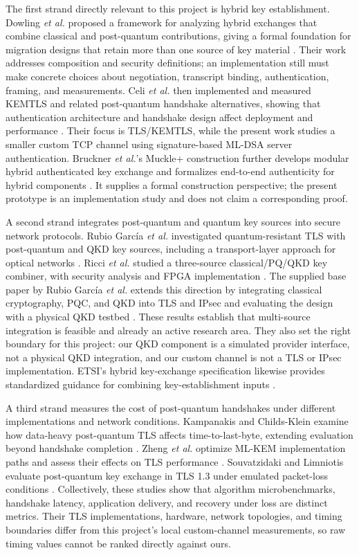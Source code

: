 \documentclass[journal]{IEEEtran}
\begin{document}
The first strand directly relevant to this project is hybrid key establishment. Dowling \emph{et al.} proposed a framework for analyzing hybrid exchanges that combine classical and post-quantum contributions, giving a formal foundation for migration designs that retain more than one source of key material \cite{dowling2020}. Their work addresses composition and security definitions; an implementation still must make concrete choices about negotiation, transcript binding, authentication, framing, and measurements. Celi \emph{et al.} then implemented and measured KEMTLS and related post-quantum handshake alternatives, showing that authentication architecture and handshake design affect deployment and performance \cite{celi2021}. Their focus is TLS/KEMTLS, while the present work studies a smaller custom TCP channel using signature-based ML-DSA server authentication. Bruckner \emph{et al.}'s Muckle+ construction further develops modular hybrid authenticated key exchange and formalizes end-to-end authenticity for hybrid components \cite{bruckner2023}. It supplies a formal construction perspective; the present prototype is an implementation study and does not claim a corresponding proof.

A second strand integrates post-quantum and quantum key sources into secure network protocols. Rubio Garc\'ia \emph{et al.} investigated quantum-resistant TLS with post-quantum and QKD key sources, including a transport-layer approach for optical networks \cite{rubio2024tls,rubio2024ofc}. Ricci \emph{et al.} studied a three-source classical/PQ/QKD key combiner, with security analysis and FPGA implementation \cite{ricci2024}. The supplied base paper by Rubio Garc\'ia \emph{et al.} extends this direction by integrating classical cryptography, PQC, and QKD into TLS and IPsec and evaluating the design with a physical QKD testbed \cite{rubio2025}. These results establish that multi-source integration is feasible and already an active research area. They also set the right boundary for this project: our QKD component is a simulated provider interface, not a physical QKD integration, and our custom channel is not a TLS or IPsec implementation. ETSI's hybrid key-exchange specification likewise provides standardized guidance for combining key-establishment inputs \cite{etsi103744}.

A third strand measures the cost of post-quantum handshakes under different implementations and network conditions. Kampanakis and Childs-Klein examine how data-heavy post-quantum TLS affects time-to-last-byte, extending evaluation beyond handshake completion \cite{kampanakis2024}. Zheng \emph{et al.} optimize ML-KEM implementation paths and assess their effects on TLS performance \cite{zheng2024}. Souvatzidaki and Limniotis evaluate post-quantum key exchange in TLS 1.3 under emulated packet-loss conditions \cite{souvatzidaki2025}. Collectively, these studies show that algorithm microbenchmarks, handshake latency, application delivery, and recovery under loss are distinct metrics. Their TLS implementations, hardware, network topologies, and timing boundaries differ from this project's local custom-channel measurements, so raw timing values cannot be ranked directly against ours.
\end{document}
